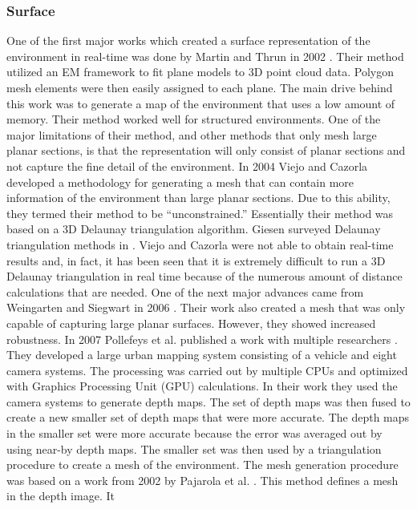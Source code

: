 \subsubsection{Surface}

One of the first major works which created a surface representation of the
environment in real-time was done by Martin and Thrun in 2002
\cite{Martin2002}. Their method utilized an EM framework to fit plane
models to 3D point cloud data. Polygon mesh elements were then easily
assigned to each plane. The main drive behind this work was to generate a
map of the environment that uses a low amount of memory. Their  method
worked well for structured environments. One of the major limitations of
their method, and other methods that only mesh large planar sections, is
that the representation will only consist of planar sections and not
capture the fine detail of the environment. In 2004 Viejo and Cazorla
\cite{springerlink:10.1007/978-3-540-30463-0_30} developed a methodology
for generating a mesh that can contain more information of the environment
than large planar sections. Due to this ability, they termed their method
to be ``unconstrained.'' Essentially their method was based on a 3D
Delaunay triangulation algorithm. Giesen surveyed Delaunay triangulation
methods in \cite{Giesen2004}. Viejo and Cazorla were not able to obtain
real-time results and, in fact, it has been seen that it is extremely
difficult to run a 3D Delaunay triangulation in real time because of the
numerous amount of distance calculations that are needed.  One of the next
major advances came from Weingarten and Siegwart in 2006
\cite{Weingarten2006}. Their work also created a mesh that was only capable
of capturing large planar surfaces. However, they showed increased
robustness. In 2007 Pollefeys et al. published a work with multiple
researchers \cite{Akbarzadeh2006,Pollefeys2007}. They developed a large
urban mapping system consisting of a vehicle and eight camera systems. The
processing was carried out by multiple CPUs and optimized with Graphics
Processing Unit (GPU) calculations. In their work they used the camera
systems to generate depth maps. The set of depth maps was then fused to
create a new smaller set of depth maps that were more accurate. The depth
maps in the smaller set were more accurate because the error was averaged
out by using near-by depth maps. The smaller set was then used by a
triangulation procedure to create a mesh of the environment.  The mesh
generation procedure was based on a work from 2002 by Pajarola et al.
\cite{Pajarola2002}. This method defines a mesh in the depth image. It
